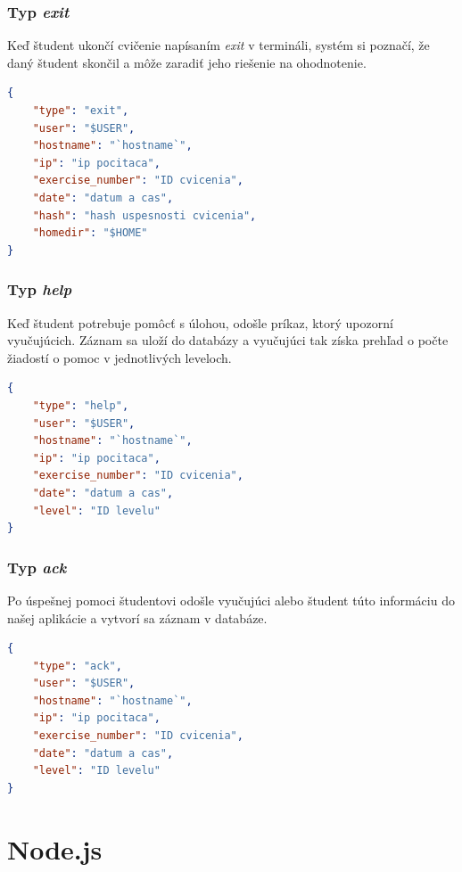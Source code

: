 \subsubsection{Typ \textit{exit}}
\label{sec:zbieraniedat:exit}

Keď študent ukončí cvičenie napísaním \textit{exit} v termináli,
systém si poznačí, že daný študent skončil a môže zaradiť jeho riešenie
na ohodnotenie.

\begin{lstlisting}[language=json,firstnumber=1]
{
    "type": "exit",
    "user": "$USER",
    "hostname": "`hostname`",
    "ip": "ip pocitaca",
    "exercise_number": "ID cvicenia",
    "date": "datum a cas",
    "hash": "hash uspesnosti cvicenia",
    "homedir": "$HOME"
}
\end{lstlisting}

\subsubsection{Typ \textit{help}}
\label{sec:zbieraniedat:help}

Keď študent potrebuje pomôcť s úlohou, odošle príkaz, ktorý upozorní vyučujúcich.
Záznam sa uloží do databázy a vyučujúci tak získa prehľad o počte žiadostí
o pomoc v jednotlivých leveloch.

\begin{lstlisting}[language=json,firstnumber=1]
{
    "type": "help",
    "user": "$USER",
    "hostname": "`hostname`",
    "ip": "ip pocitaca",
    "exercise_number": "ID cvicenia",
    "date": "datum a cas",
    "level": "ID levelu"
}
\end{lstlisting}

\subsubsection{Typ \textit{ack}}
\label{sec:zbieraniedat:ack}

Po úspešnej pomoci študentovi odošle vyučujúci alebo študent túto informáciu
do našej aplikácie a vytvorí sa záznam v databáze.

\begin{lstlisting}[language=json,firstnumber=1]
{
    "type": "ack",
    "user": "$USER",
    "hostname": "`hostname`",
    "ip": "ip pocitaca",
    "exercise_number": "ID cvicenia",
    "date": "datum a cas",
    "level": "ID levelu"
}
\end{lstlisting}

\section{Node.js}
\label{sec:nodejs}

